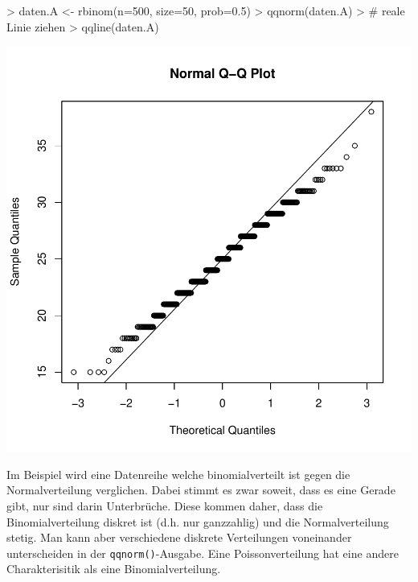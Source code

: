 \begin{Schunk}
\begin{Sinput}
> daten.A <- rbinom(n=500, size=50, prob=0.5)
> qqnorm(daten.A)
> # reale Linie ziehen 
> qqline(daten.A)
\end{Sinput}
\end{Schunk}
\includegraphics{definitionen-030}

\noindent
Im Beispiel wird eine Datenreihe welche binomialverteilt ist gegen
die Normalverteilung verglichen. Dabei stimmt es zwar soweit, dass
es eine Gerade gibt, nur sind darin Unterbrüche. Diese kommen daher, 
dass die Binomialverteilung diskret ist (d.h. nur ganzzahlig) und
die Normalverteilung stetig. Man kann aber verschiedene diskrete
Verteilungen voneinander unterscheiden in der \verb!qqnorm()!-Ausgabe.
Eine Poissonverteilung hat eine andere Charakterisitik als eine
Binomialverteilung.

